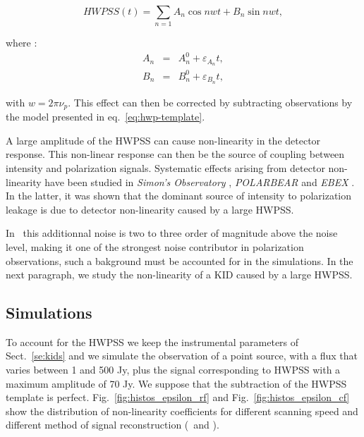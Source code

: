 \begin{equation}
HWPSS(t) = \sum_{n=1} A_{n} \cos nwt + B_{n} \sin nwt , 
\label{eq:hwp-template}
\end{equation}

where : 
\begin{eqnarray}
A_{n}  &=& A_{n}^{0} + \varepsilon_{A_{n}}t,\\
B_{n}  &=& B_{n}^{0} + \varepsilon_{B_{n}}t, 
\end{eqnarray}

with $w = 2 \pi \nu_{p}$.
This effect can then be corrected by subtracting observations by the model presented in eq.~\ref{eq:hwp-template}. 

A large amplitude of the HWPSS can cause non-linearity in the detector response. This non-linear response can then be the source of coupling between intensity and polarization signals. Systematic effects arising from detector non-linearity have been studied in \emph{Simon's Observatory} \citep{2018SPIE10708E..48S}, \emph{POLARBEAR} \citep{2017JCAP...05..008T} and \emph{EBEX} \citep{2017arXiv171101314D}. In the latter, it was shown that the dominant source of intensity to polarization leakage is due to detector non-linearity caused by a large HWPSS. 

In \nikad\ this additionnal noise is two to three order of magnitude above the noise level, making it one of the strongest noise contributor in polarization observations, such a bakground must be accounted for in the simulations. In the next paragraph, we study the non-linearity of a KID caused by a large HWPSS. 


\subsection{Simulations}

To account for the HWPSS we keep the instrumental parameters of Sect.~\ref{se:kids} and we simulate the observation of a point source, with a flux that varies between 1 and 500 Jy, plus the signal corresponding to HWPSS with a maximum amplitude of 70 Jy. We suppose that the subtraction of the HWPSS template is perfect. Fig.~\ref{fig:histos_epsilon_rf} and Fig.~\ref{fig:histos_epsilon_cf} show the distribution of non-linearity coefficients for different scanning speed and different method of signal reconstruction (\rf\ and \cf). 


